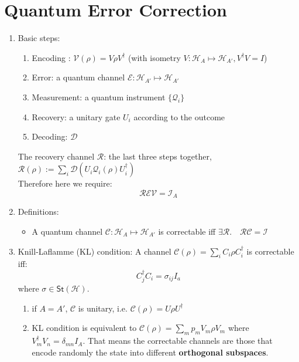 \documentclass[11pt,a4paper]{article}%
\numberwithin{equation}{section}
\newcommand{\St}{{\mathsf{St}}}
\begin{document}
\section{Quantum Error Correction} %
\label{sec:quantum_error_correction}
\begin{enumerate}
    \item Basic steps:
    \begin{enumerate}
        \item Encoding : $\mathscr V(\rho) = V\rho V^\dagger$ (with isometry $V: \mathcal H_A\mapsto \mathcal H_{A'}, V^\dagger V = I$)
        \item Error: a quantum channel $\mathscr E: \mathcal H_{A'}\mapsto \mathcal H_{A'}$
        \item Measurement: a quantum instrument $\{\mathscr Q_i\}$
        \item Recovery: a unitary gate $U_i$ according to the outcome
        \item Decoding: $\mathscr D$
    \end{enumerate}
    The recovery channel $\mathscr R$: the last three steps together, $\mathscr R(\rho) := \sum_i\mathscr D\left(U_i\mathscr Q_i(\rho)U_i^\dagger\right)$\\
    Therefore here we require:
    \begin{equation}
        \mathscr{REV} = \mathscr I_A
    \end{equation}
    \item Definitions:
    \begin{itemize}
        \item A quantum channel $\mathscr C:\mathcal H_A\mapsto\mathcal H_{A'}$ is correctable iff $\exists \mathscr R.\quad \mathscr{RC} = \mathscr I$
    \end{itemize}
    \item Knill-Laflamme (KL) condition: A channel $\mathscr C(\rho) = \sum_i C_i\rho C_i^\dagger$ is correctable iff:
    \begin{equation}
        C_j^\dagger C_i = \sigma_{ij} I_a
    \end{equation}
    where $\sigma\in\St(\mathcal H)$. 
    \begin{enumerate}
        \item if $A = A'$, $\mathscr C$ is unitary, i.e. $\mathscr C(\rho) = U\rho U^\dagger$ 
        \item KL condition is equivalent to $\mathscr C(\rho) = \sum_m p_m V_m\rho V_m$ where $V_m^\dagger V_n = \delta_{mn}I_A$. That means the correctable channels are those that encode randomly the state into different \textbf{orthogonal subspaces}.

\end{enumerate}
\end{enumerate}
\end{document}
